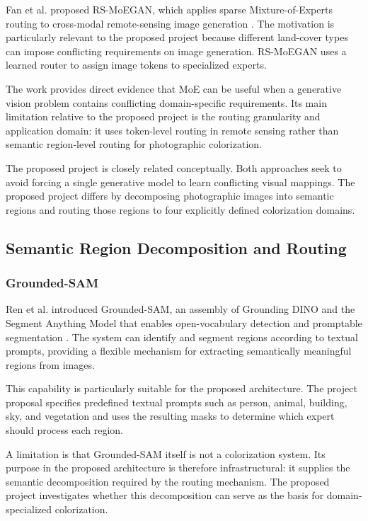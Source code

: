\documentclass{FastFyp}
\begin{document}
Fan et al. proposed RS-MoEGAN, which applies sparse Mixture-of-Experts routing to cross-modal remote-sensing image generation \cite{ref16}. The motivation is particularly relevant to the proposed project because different land-cover types can impose conflicting requirements on image generation. RS-MoEGAN uses a learned router to assign image tokens to specialized experts.

The work provides direct evidence that MoE can be useful when a generative vision problem contains conflicting domain-specific requirements. Its main limitation relative to the proposed project is the routing granularity and application domain: it uses token-level routing in remote sensing rather than semantic region-level routing for photographic colorization.

The proposed project is closely related conceptually. Both approaches seek to avoid forcing a single generative model to learn conflicting visual mappings. The proposed project differs by decomposing photographic images into semantic regions and routing those regions to four explicitly defined colorization domains.

\subsection{Semantic Region Decomposition and Routing}

\subsubsection{Grounded-SAM}

Ren et al. introduced Grounded-SAM, an assembly of Grounding DINO and the Segment Anything Model that enables open-vocabulary detection and promptable segmentation \cite{ref17}. The system can identify and segment regions according to textual prompts, providing a flexible mechanism for extracting semantically meaningful regions from images.

This capability is particularly suitable for the proposed architecture. The project proposal specifies predefined textual prompts such as person, animal, building, sky, and vegetation and uses the resulting masks to determine which expert should process each region.

A limitation is that Grounded-SAM itself is not a colorization system. Its purpose in the proposed architecture is therefore infrastructural: it supplies the semantic decomposition required by the routing mechanism. The proposed project investigates whether this decomposition can serve as the basis for domain-specialized colorization.
\end{document}

